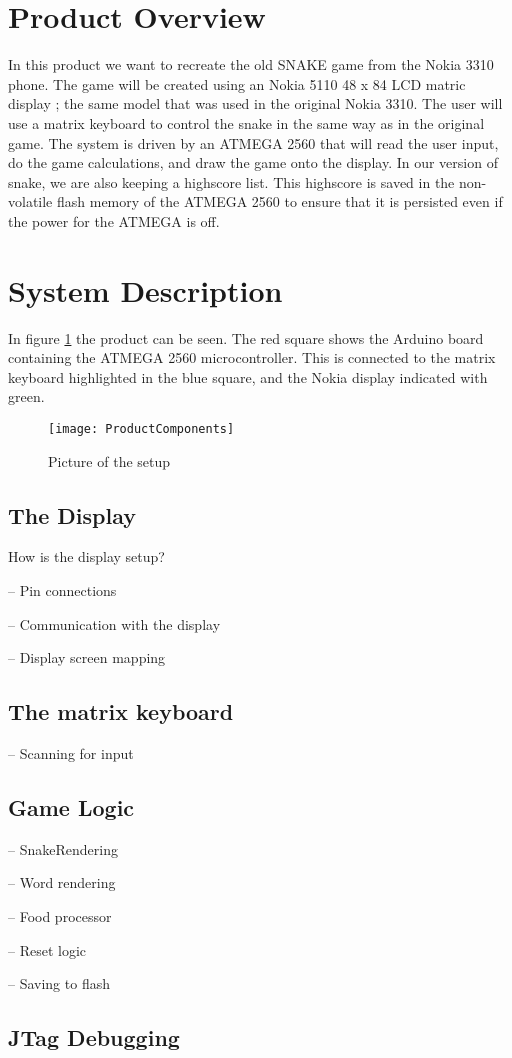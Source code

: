 \section{Product Overview}
In this product we want to recreate the old SNAKE game from the Nokia 3310 phone. The game will be created using an Nokia 5110 48 x 84 LCD matric display \cite{NokiaDisplay}; the same model that was used in the original Nokia 3310. The user will use a matrix keyboard to control the snake in the same way as in the original game. The system is driven by an ATMEGA 2560 that will read the user input, do the game calculations, and draw the game onto the display. In our version of snake, we are also keeping a highscore list. This highscore is saved in the non-volatile flash memory of the ATMEGA 2560 to ensure that it is persisted even if the power for the ATMEGA is off.

\section{System Description}
In figure \ref{ProductComponents} the product can be seen. The red square shows the Arduino board containing the ATMEGA 2560 microcontroller. This is connected to the matrix keyboard highlighted in the blue square, and the Nokia display indicated with green. 

\begin{figure}[H]
	\texttt{[image: ProductComponents]}
	\centering
	\caption{Picture of the setup}
	\label{ProductComponents}
\end{figure}

\subsection{The Display}
How is the display setup?

-- Pin connections

-- Communication with the display

-- Display screen mapping

\subsection{The matrix keyboard}
-- Scanning for input

\subsection{Game Logic}
-- SnakeRendering

-- Word rendering

-- Food processor

-- Reset logic

-- Saving to flash

\subsection{JTag Debugging}
